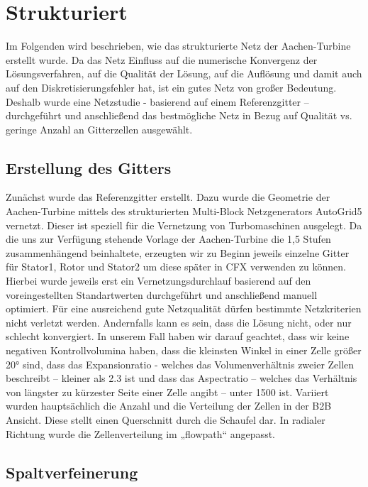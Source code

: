 \section{Strukturiert}
Im Folgenden wird beschrieben, wie das strukturierte Netz der Aachen-Turbine erstellt wurde. Da das Netz Einfluss auf die numerische Konvergenz der Lösungsverfahren, auf die Qualität der Lösung, auf die Auflösung und damit auch auf den Diskretisierungsfehler hat, ist ein gutes Netz von großer Bedeutung. Deshalb wurde eine Netzstudie - basierend auf einem Referenzgitter – durchgeführt und anschließend das bestmögliche Netz in Bezug auf Qualität vs. geringe Anzahl an Gitterzellen ausgewählt. 

\subsection{Erstellung des Gitters}

Zunächst wurde das Referenzgitter erstellt. Dazu wurde die Geometrie der Aachen-Turbine mittels des strukturierten Multi-Block Netzgenerators AutoGrid5 vernetzt. Dieser ist speziell für die Vernetzung von Turbomaschinen ausgelegt. 
Da die uns zur Verfügung stehende Vorlage der Aachen-Turbine die 1,5 Stufen zusammenhängend beinhaltete, erzeugten wir zu Beginn jeweils einzelne Gitter für Stator1, Rotor und Stator2 um diese später in CFX verwenden zu können. Hierbei wurde jeweils erst ein Vernetzungsdurchlauf basierend auf den voreingestellten Standartwerten durchgeführt und anschließend manuell optimiert. Für eine ausreichend gute Netzqualität dürfen bestimmte Netzkriterien nicht verletzt werden. Andernfalls kann es sein, dass die Lösung nicht, oder nur schlecht konvergiert. In unserem Fall haben wir darauf geachtet, dass wir keine negativen Kontrollvolumina haben, dass die kleinsten Winkel in einer Zelle größer 20° sind, dass das Expansionratio - welches das Volumenverhältnis zweier Zellen beschreibt – kleiner als 2.3 ist und dass das Aspectratio – welches das Verhältnis von längster zu kürzester Seite einer Zelle angibt – unter 1500 ist. Variiert wurden hauptsächlich die Anzahl und die Verteilung der Zellen in der B2B Ansicht. Diese stellt einen Querschnitt durch die Schaufel dar. In radialer Richtung wurde die Zellenverteilung im „flowpath“ angepasst. 

\subsection{Spaltverfeinerung}

